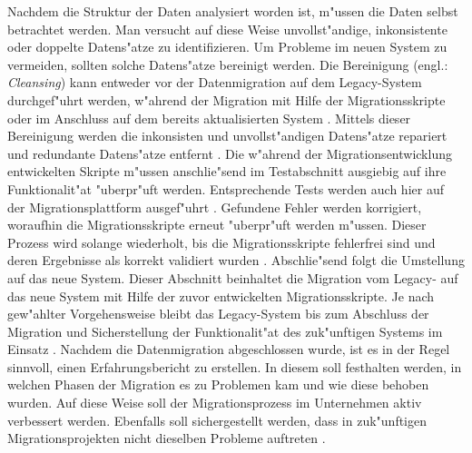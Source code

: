 \lb
Nachdem die Struktur der Daten analysiert worden ist, m"ussen die Daten selbst betrachtet werden. Man versucht auf diese Weise unvollst"andige, inkonsistente oder doppelte Datens"atze zu identifizieren. Um Probleme im neuen System zu vermeiden, sollten solche Datens"atze bereinigt werden. Die Bereinigung (engl.: \textit{ Cleansing}) \cite{hernandez-1998} kann entweder vor der Datenmigration auf dem Legacy-System durchgef"uhrt werden, w"ahrend der Migration mit Hilfe der Migrationsskripte oder im Anschluss auf dem bereits aktualisierten System \citep[S~7f.]{klausMatthesSchulz-2012}. Mittels dieser Bereinigung werden die inkonsisten und unvollst"andigen Datens"atze repariert und redundante Datens"atze entfernt \citep[S.~7f.]{rahm-2010}. 
\lb
Die w"ahrend der Migrationsentwicklung entwickelten Skripte m"ussen anschlie"send im Testabschnitt ausgiebig auf ihre Funktionalit"at "uberpr"uft werden. Entsprechende Tests werden auch hier auf der Migrationsplattform ausgef"uhrt \citep[S.~8f.]{klausMatthesSchulz-2012}. Gefundene Fehler werden korrigiert, woraufhin die Migrationsskripte erneut "uberpr"uft werden m"ussen. Dieser Prozess wird solange wiederholt, bis die Migrationsskripte fehlerfrei sind und deren Ergebnisse als korrekt validiert wurden \citep[S.~8f.]{klausMatthesSchulz-2012}.
\lb
Abschlie"send folgt die Umstellung auf das neue System. Dieser Abschnitt beinhaltet die Migration vom Legacy- auf das neue System mit Hilfe der zuvor entwickelten Migrationsskripte. Je nach gew"ahlter Vorgehensweise bleibt das Legacy-System bis zum Abschluss der Migration und Sicherstellung der Funktionalit"at des zuk"unftigen Systems im Einsatz \citep[S.~107]{bisbal-1999}. 
\lb
Nachdem die Datenmigration abgeschlossen wurde, ist es in der Regel sinnvoll, einen Erfahrungsbericht zu erstellen. In diesem soll festhalten werden, in welchen Phasen der Migration es zu Problemen kam und wie diese behoben wurden. Auf diese Weise soll der Migrationsprozess im Unternehmen aktiv verbessert werden. Ebenfalls soll sichergestellt werden, dass in zuk"unftigen Migrationsprojekten nicht dieselben Probleme auftreten \citep[S.~10]{klausMatthesSchulz-2012}.


